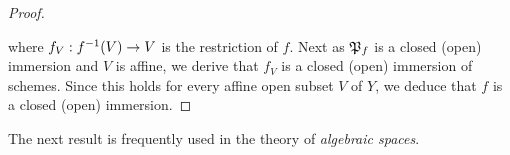 \begin{proof}
\begin{center}
\end{center}
where $f_V:f^{-1}(V)\rightarrow V$ is the restriction of $f$. Next as ${\mathfrak P}_f$ is a closed (open) immersion and $V$ is affine, we derive that $f_V$ is a closed (open) immersion of schemes. Since this holds for every affine open subset $V$ of $Y$, we deduce that $f$ is a closed (open) immersion.
\end{proof}
\noindent
The next result is frequently used in the theory of \textit{algebraic spaces}.

